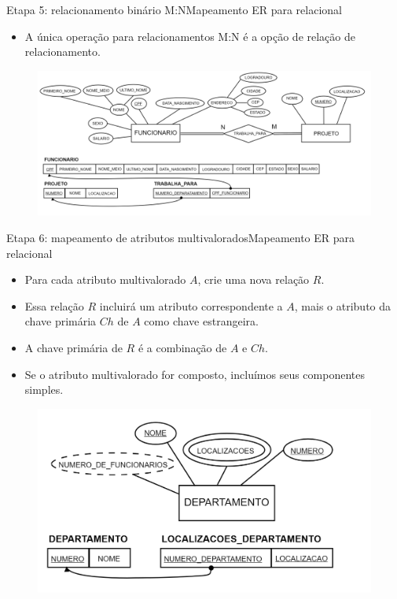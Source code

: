 \documentclass[t]{beamer}
\begin{document}

\begin{ftst}{Etapa 5: relacionamento binário M:N}{Mapeamento ER para relacional}
\small
\begin{itemize}
    \item A única operação para relacionamentos M:N é a opção de relação de relacionamento.
\end{itemize}
\begin{figure}
    \centering
    \includegraphics[scale=0.12]{Figuras/03_10.png}
\end{figure}
\end{ftst}


\begin{ftst}{Etapa 6: mapeamento de atributos multivalorados}{Mapeamento ER para relacional}
\begin{itemize}
    \item Para cada atributo multivalorado $A$, crie uma nova relação $R$.
    \item Essa relação $R$ incluirá um atributo correspondente a $A$, mais o atributo da chave primária $Ch$ de $A$ como chave estrangeira.
    \item A chave primária de $R$ é a combinação de $A$ e $Ch$.
    \item Se o atributo multivalorado for composto, incluímos seus componentes simples.
\end{itemize}
\begin{figure}
    \centering
    \includegraphics[scale=0.15]{Figuras/03_11.png}
\end{figure}

\end{ftst}
\end{document}
